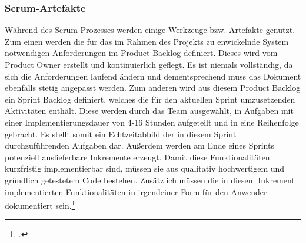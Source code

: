 \subsubsection{Scrum-Artefakte}
Während des Scrum-Prozesses werden einige Werkzeuge bzw. Artefakte genutzt. Zum einen werden die für das im Rahmen des Projekts zu enwickelnde System notwendigen Anforderungen im Product Backlog definiert. Dieses wird vom Product Owner erstellt und kontinuierlich geflegt. Es ist niemals vollständig, da sich die Anforderungen laufend ändern und dementsprechend muss das Dokument ebenfalls stetig  angepasst werden. Zum anderen wird aus diesem Product Backlog ein Sprint Backlog definiert, welches die für den aktuellen Sprint umzusetzenden Aktivitäten enthält. Diese werden durch das Team ausgewählt, in Aufgaben mit einer Implementierungsdauer von 4-16 Stunden aufgeteilt und in eine Reihenfolge gebracht. Es stellt somit ein Echtzeitabbild der in diesem Sprint durchzuführenden Aufgaben dar. Außerdem werden am Ende eines Sprints potenziell auslieferbare Inkremente erzeugt. Damit diese Funktionalitäten kurzfristig implementierbar sind, müssen sie aus qualitativ hochwertigem und gründlich getestetem Code bestehen. Zusätzlich müssen die in diesem Inkrement implementierten Funktionalitäten in irgendeiner Form für den Anwender dokumentiert sein.\footcite[Vgl.][Seite 10-15]{schwabo} 
